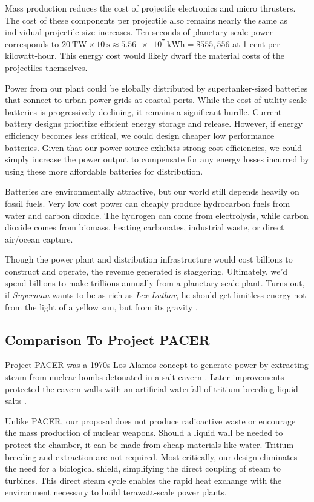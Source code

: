 \documentclass{article}
\begin{document}
Mass production reduces the cost of projectile electronics and micro thrusters. The cost of these components per projectile also remains nearly the same as individual projectile size increases.  Ten seconds of planetary scale power corresponds to $\SI{20}{\tera\watt} \times \SI{10}{\second} \approx \SI{5.56e7}{\kilo\watt\hour} = \$555,556$ at 1 cent per kilowatt-hour.  This energy cost would likely dwarf the material costs of the projectiles themselves.      

Power from our plant could be globally distributed by supertanker-sized batteries that connect to urban power grids at coastal ports.  While the cost of utility-scale batteries is progressively declining, it remains a significant hurdle. Current battery designs prioritize efficient energy storage and release. However, if energy efficiency becomes less critical, we could design cheaper low performance batteries. Given that our power source exhibits strong cost efficiencies, we could simply increase the power output to compensate for any energy losses incurred by using these more affordable batteries for distribution. 

Batteries are environmentally attractive, but our world still depends heavily on fossil fuels.  Very low cost power can cheaply produce hydrocarbon fuels from water and carbon dioxide.  The hydrogen can come from electrolysis, while carbon dioxide comes from biomass, heating carbonates, industrial waste, or direct air/ocean capture.

Though the power plant and distribution infrastructure would cost billions to construct and operate, the revenue generated is staggering. Ultimately, we'd spend billions to make trillions annually from a planetary-scale plant.  Turns out, if  \textit{Superman} wants to be as rich as \textit{Lex Luthor}, he should get limitless energy not from the light of a yellow sun, but from its gravity \cite{superman2025}.

\subsection{Comparison To Project PACER}
Project PACER was a 1970s Los Alamos concept to generate power by extracting steam from nuclear bombs detonated in a salt cavern \cite{pacer_1975}.   Later improvements protected the cavern walls with an artificial waterfall of tritium breeding liquid salts \cite{pacer_revisited}.  

Unlike PACER, our proposal does not produce radioactive waste or encourage the mass production of nuclear weapons.   Should a liquid wall be needed to protect the chamber, it can be made from cheap materials like water.  Tritium breeding and extraction are not required.   Most critically, our design eliminates the need for a biological shield, simplifying the direct coupling of steam to turbines. This direct steam cycle enables the rapid heat exchange with the environment necessary to build terawatt-scale power plants.
\end{document}
